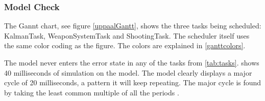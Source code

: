 \subsubsection{Model Check}
The Gannt chart, see figure \cref{uppaalGantt}, shows the three tasks being scheduled: KalmanTask, WeaponSystemTask and ShootingTask. The scheduler itself uses the same color coding as the figure. The colors are explained in \cref{ganttcolors}.



The model never enters the error state in any of the tasks from \cref{tab:tasks}.  shows 40 milliseconds of simulation on the model. The model clearly displays a major cycle of 20 milliseconds, a pattern it will keep repeating. The major cycle is found by taking the least common multiple of all the periods \cite[slide 17]{utilization}. 


\begin{sidewaysfigure}
\centering
\def\svgwidth{\columnwidth}

\caption{Uppaal Gantt}
\label{uppaalGantt}
\end{sidewaysfigure}


